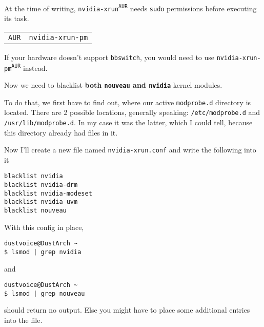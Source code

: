 \documentclass[9pt]{report}
\newenvironment{NOTE}
{\begin{tcolorbox}[colback=admonitionBG,coltitle=draculaFG,colframe=draculaBlue,colbacktitle=draculaBlue,title=NOTE]}
{\end{tcolorbox}}
\newenvironment{IMPORTANT}
{\begin{tcolorbox}[colback=admonitionBG,coltitle=draculaFG,colframe=draculaRed,colbacktitle=draculaRed,title=IMPORTANT]}
{\end{tcolorbox}}
\newenvironment{packagetable}
{\begin{longtabu}to \textwidth [b]{X[1,r]|X[1,l]}}
{\end{longtabu}}
\begin{document}
\begin{IMPORTANT}
    At the time of writing, \texttt{nvidia-xrun\textsuperscript{\texttt{AUR}}} needs \texttt{sudo} permissions before executing its task.

\end{IMPORTANT}
\begin{NOTE}
    \begin{packagetable}
        \texttt{AUR} & \texttt{nvidia-xrun-pm} \\ 
    \end{packagetable}

    If your hardware doesn’t support \texttt{bbswitch}, you would need to use \texttt{nvidia-xrun-pm\textsuperscript{\texttt{AUR}}} instead.

\end{NOTE}
Now we need to blacklist \textbf{both \texttt{nouveau} and \texttt{nvidia}} kernel modules.


To do that, we first have to find out, where our active \texttt{modprobe.d} directory is located.
There are 2 possible locations, generally speaking: \texttt{/etc/modprobe.d} and \texttt{/usr/lib/modprobe.d}.
In my case it was the latter, which I could tell, because this directory already had files in it.


Now I’ll create a new file named \texttt{nvidia-xrun.conf} and write the following into it


\begin{verbatim}
blacklist nvidia
blacklist nvidia-drm
blacklist nvidia-modeset
blacklist nvidia-uvm
blacklist nouveau
\end{verbatim}

With this config in place,


\begin{verbatim}
dustvoice@DustArch ~
$ lsmod | grep nvidia
\end{verbatim}

and


\begin{verbatim}
dustvoice@DustArch ~
$ lsmod | grep nouveau
\end{verbatim}

should return no output.
Else you might have to place some additional entries into the file.
\end{document}
